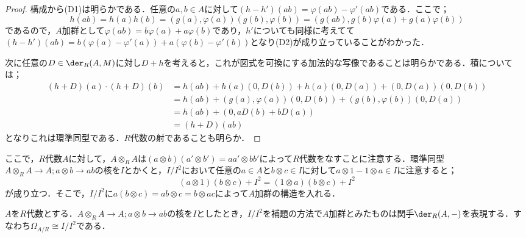 \begin{proof}
	構成から(D1)は明らかである．任意の$a,b\in A$に対して$(h-h')(ab)=\varphi(ab)-\varphi'(ab)$である．ここで；
	\[h(ab)=h(a)h(b)=(g(a),\varphi(a))(g(b),\varphi(b))=(g(ab),g(b)\varphi(a)+g(a)\varphi(b))\]
	であるので，$A$加群として$\varphi(ab)=b\varphi(a)+a\varphi(b)$であり，$h'$についても同様に考えてて$(h-h')(ab)=b(\varphi(a)-\varphi'(a))+a(\varphi(b)-\varphi'(b))$となり(D2)が成り立っていることがわかった．
	
	次に任意の$D\in\der_R(A,M)$に対し$D+h$を考えると，これが図式を可換にする加法的な写像であることは明らかである．積については；
	\[\begin{aligned}
		(h+D)(a)\cdot (h+D)(b)&=h(ab)+h(a)(0,D(b))+h(a)(0,D(a))+(0,D(a))(0,D(b))\\
		&=h(ab)+(g(a),\varphi(a))(0,D(b))+(g(b),\varphi(b))(0,D(a))\\
		&=h(ab)+(0,aD(b)+bD(a))\\
		&=(h+D)(ab)
	\end{aligned}\]
	となりこれは環準同型である．$R$代数の射であることも明らか．
\end{proof}

ここで，$R$代数$A$に対して，$A\otimes_R A$は$(a\otimes b)(a'\otimes b')=aa'\otimes bb'$によって$R$代数をなすことに注意する．環準同型$A\otimes_R A\to A;a\otimes b\to ab$の核を$I$とかくと，$I/I^2$において任意の$a\in A$と$b\otimes c\in I$に対して$a\otimes 1-1\otimes a\in I$に注意すると；
\[(a\otimes 1)(b\otimes c)+I^2=(1\otimes a)(b\otimes c)+I^2\]
が成り立つ．そこで，$I/I^2$に$a(b\otimes c)=ab\otimes c=b\otimes ac$によって$A$加群の構造を入れる．

\begin{thm}
	$A$を$R$代数とする．$A\otimes_R A\to A;a\otimes b\to ab$の核を$I$としたとき，$I/I^2$を補題の方法で$A$加群とみたものは関手$\der_R(A,-)$を表現する．すなわち$\Omega_{A/R}\cong I/I^2$である．
\end{thm}

